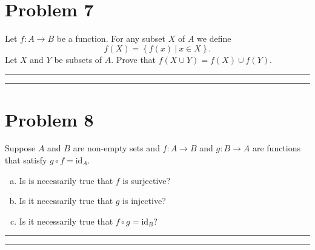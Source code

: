 \documentclass{article}
\theoremstyle{definition}
\newenvironment{solution}{\bigskip\hrule{\hfill}}{\bigskip\hrule{\hfill}} %
\begin{document}

\newpage


\section*{Problem 7}
Let $f:A\longrightarrow B$ be a function. For any subset $X$ of $A$ we define $$f\left(X\right)=\left\{f\left(x\right)~\big\vert~x\in X\right\}.$$ Let $X$ and $Y$ be subsets of $A$. Prove that $f\left(X\cup Y\right)=f\left(X\right)\cup f\left(Y\right)$.
\begin{solution}


\end{solution}


\newpage


\section*{Problem 8}
Suppose $A$ and $B$ are non-empty sets and $f:A\longrightarrow B$ and $g:B\longrightarrow A$ are functions that satisfy $g\circ f=\text{id}_A$.
\begin{enumerate}[a)] %
    \item Is is necessarily true that $f$ is surjective?
    \item Is it necessarily true that $g$ is injective?
    \item Is it necessarily true that $f\circ g=\text{id}_B$?
\end{enumerate}
\begin{solution}


\end{solution}

\end{document}
